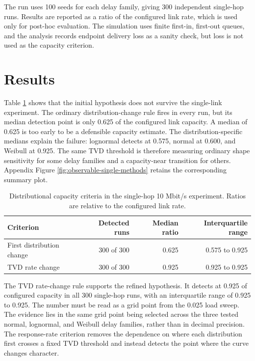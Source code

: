 \documentclass[a4paper,11pt]{report}
\begin{document}
The run uses 100 seeds for each delay family, giving 300 independent single-hop runs. Results are reported as a ratio of the configured link rate, which is used only for post-hoc evaluation. The simulation uses finite first-in, first-out queues, and the analysis records endpoint delivery loss as a sanity check, but loss is not used as the capacity criterion.

\section{Results}

Table \ref{tab:observable-single-methods} shows that the initial hypothesis does not survive the single-link experiment. The ordinary distribution-change rule fires in every run, but its median detection point is only 0.625 of the configured link capacity. A median of 0.625 is too early to be a defensible capacity estimate. The distribution-specific medians explain the failure: lognormal detects at 0.575, normal at 0.600, and Weibull at 0.925. The same TVD threshold is therefore measuring ordinary shape sensitivity for some delay families and a capacity-near transition for others. Appendix Figure \ref{fig:observable-single-methods} retains the corresponding summary plot.

\begin{table}[htbp]
\centering
\small
\begin{tabular}{lrrr}
\toprule
Criterion & Detected runs & Median ratio & Interquartile range \\
\midrule
First distribution change & 300 of 300 & 0.625 & 0.575 to 0.925 \\
TVD rate change & 300 of 300 & 0.925 & 0.925 to 0.925 \\
\bottomrule
\end{tabular}
\caption{Distributional capacity criteria in the single-hop 10 Mbit/s experiment. Ratios are relative to the configured link rate.}
\label{tab:observable-single-methods}
\end{table}

The TVD rate-change rule supports the refined hypothesis. It detects at 0.925 of configured capacity in all 300 single-hop runs, with an interquartile range of 0.925 to 0.925. The number must be read as a grid point from the 0.025 load sweep. The evidence lies in the same grid point being selected across the three tested normal, lognormal, and Weibull delay families, rather than in decimal precision. The response-rate criterion removes the dependence on where each distribution first crosses a fixed TVD threshold and instead detects the point where the curve changes character.
\end{document}
